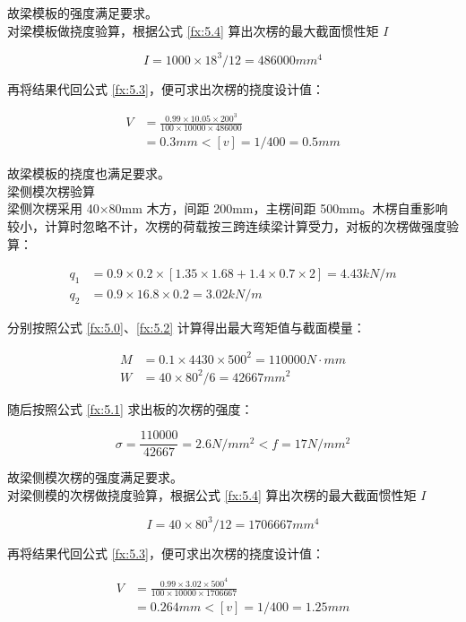 故梁模板的强度满足要求。\\

对梁模板做挠度验算，根据公式 \ref{fx:5.4} 算出次楞的最大截面惯性矩 $I$

\[
    I=1000\times 18^3 /12=486000 mm^4
\]

再将结果代回公式 \ref{fx:5.3}，便可求出次楞的挠度设计值：

\begin{align*}
    V&=\frac{0.99\times 10.05 \times 200^3}{100\times 10000\times 486000}\\
    &=0.3 mm<[v]=1/400=0.5mm
\end{align*}

故梁模板的挠度也满足要求。\\

 梁侧模次楞验算\\

梁侧次楞采用 40×80mm 木方，间距 200mm，主楞间距 500mm。木楞自重影响较小，计算时忽略不计，次楞的荷载按三跨连续梁计算受力，对板的次楞做强度验算：

\begin{align*}
    q_1&=0.9\times 0.2\times [1.35\times 1.68+1.4\times0.7\times 2]=4.43 kN/m \\
    q_2&=0.9\times 16.8\times 0.2=3.02 kN/m
\end{align*}

分别按照公式 \ref{fx:5.0}、\ref{fx:5.2} 计算得出最大弯矩值与截面模量：

\begin{align*}
    M&=0.1\times 4430\times 500^2=110000 N \cdot mm\\
    W&=40\times 80^2 /6=42667 mm^2
\end{align*}

随后按照公式 \ref{fx:5.1} 求出板的次楞的强度：

\[
    \sigma = \frac{110000}{42667}=2.6 N/mm^2< f=17N/mm^2
\]

故梁侧模次楞的强度满足要求。\\

对梁侧模的次楞做挠度验算，根据公式 \ref{fx:5.4} 算出次楞的最大截面惯性矩 $I$

\[
    I=40\times 80^3 /12=1706667 mm^4
\]

再将结果代回公式 \ref{fx:5.3}，便可求出次楞的挠度设计值：

\begin{align*}
    V&=\frac{0.99\times 3.02 \times 500^4}{100\times 10000\times 1706667}\\
    &=0.264 mm<[v]=1/400=1.25mm
\end{align*}


